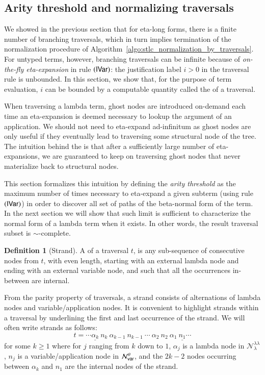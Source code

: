 \documentclass{elsarticle}
\theoremstyle{plain}
\theoremstyle{definition}
\newtheorem{definition}{Definition}[section]
\theoremstyle{remark}
\newcommand\Nodes{\mathcal{N}}%
\newcommand\NodesVar{\Nodes_{\sf var}}%
\newcommand\NodesLmd{\Nodes_\lambda}%
\newcommand{\ghostlmd}{{\lambda\!\!\lambda}}
\newcommand{\ghostvar}{\theta}
\newcommand\ImNodesVar{\NodesVar^\ghostvar}
\newcommand\ImNodesLmd{\NodesLmd^\ghostlmd}
\begin{document}
\subsection{Arity threshold and normalizing traversals}

We showed in the previous section that for eta-long forms, there is a finite number of branching traversals, which in turn implies termination of the normalization procedure of Algorithm~\ref{algo:stlc_normalization_by_traversals}. For untyped terms, however, branching traversals can be infinite because of \emph{on-the-fly eta-expansion} in rule $\mathbf{({\sf IVar})}$: the justification label $i>0$ in the traversal rule is unbounded. In this section, we show that, for the purpose of term evaluation, $i$ can be bounded by a computable quantity called the  of a traversal.

When traversing a lambda term, ghost nodes are introduced on-demand each time an eta-expansion is deemed necessary to lookup the argument of an application.
We should not need to eta-expand ad-infinitum as ghost nodes are only useful if they eventually lead to traversing some structural node of the tree. The intuition behind the  is that after a sufficiently large number of eta-expansions, we are guaranteed to keep on traversing ghost nodes that never materialize back to structural nodes.

This section formalizes this intuition by defining the \emph{arity threshold} as the maximum number of times necessary to eta-expand a given subterm (using rule $\mathbf{({\sf IVar})}$)  in order to discover all set of paths of the beta-normal form of the term. In the next section we will show that such limit is sufficient to characterize the normal form of a lambda term when it exists. In other words, the result traversal subset is $\sim$-complete.

\begin{definition}[Strand]
\label{ref:strand}
A  of a traversal $t$, is any sub-sequence of consecutive nodes from $t$,
with even length, starting with an external lambda node and ending with an external variable node, and such that all the occurrences in-between are internal.
\end{definition}

From the parity property of traversals, a strand consists of alternations of lambda nodes and variable/application nodes. It is convenient to highlight strands within a traversal by underlining the first and last occurrence of the strand. We will often write strands as follows:
$$ t = \cdots \underline{\alpha_k}\ n_k\ \alpha_{k-1}\ n_{k-1}\ \cdots\ \alpha_2\ n_2\ \alpha_1\ \underline{n_1} \cdots $$
for some $k\geq 1$ where for $j$ ranging from $k$ down to $1$, $\alpha_j$ is a lambda node in $\ImNodesLmd$, $n_j$ is a variable/application node in $\ImNodesVar$,
and the $2k-2$ nodes occurring  between $\alpha_k$ and $n_1$ are the internal nodes of the strand.
\end{document}
